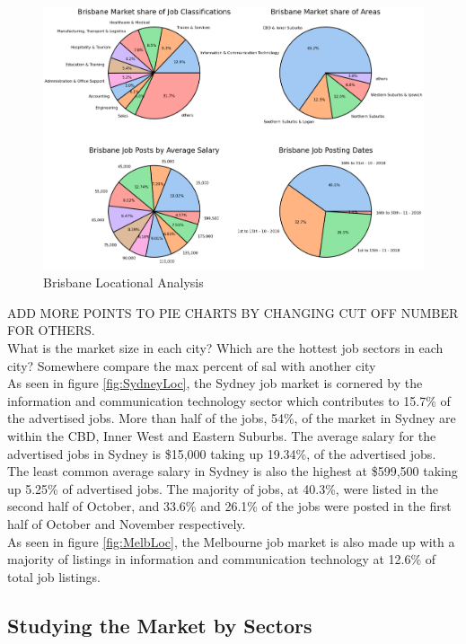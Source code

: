 \documentclass[twoside, 12pt, a4paper]{article}
\begin{document}
\newpage
\begin{figure}[h]
	\centering
	\includegraphics[scale = 0.26]{BrisbaneLocational.png}
	\caption{Brisbane Locational Analysis}
	\label{fig:BrisLoc}
\end{figure}

ADD MORE POINTS TO PIE CHARTS BY CHANGING CUT OFF NUMBER FOR OTHERS.\\
What is the market size in each city? Which are the hottest job sectors in each city? Somewhere compare the max percent of sal with another city\\
As seen in figure \ref{fig:SydneyLoc}, the Sydney job market is cornered by the information and communication technology sector which contributes to 15.7\% of the advertised jobs. More than half of the jobs, 54\%, of the market in Sydney are within the CBD, Inner West and Eastern Suburbs. The average salary for the advertised jobs in Sydney is \$15,000 taking up 19.34\%, of the advertised jobs. The least common average salary in Sydney is also the highest at \$599,500 taking up 5.25\% of advertised jobs. The majority of jobs, at 40.3\%, were listed in the second half of October, and 33.6\% and 26.1\% of the jobs were posted in the first half of October and November respectively.\\
As seen in figure \ref{fig:MelbLoc}, the Melbourne job market is also made up with a majority of listings in information and communication technology at 12.6\% of total job listings. 

\newpage
\subsection{Studying the Market by Sectors}
\end{document}
